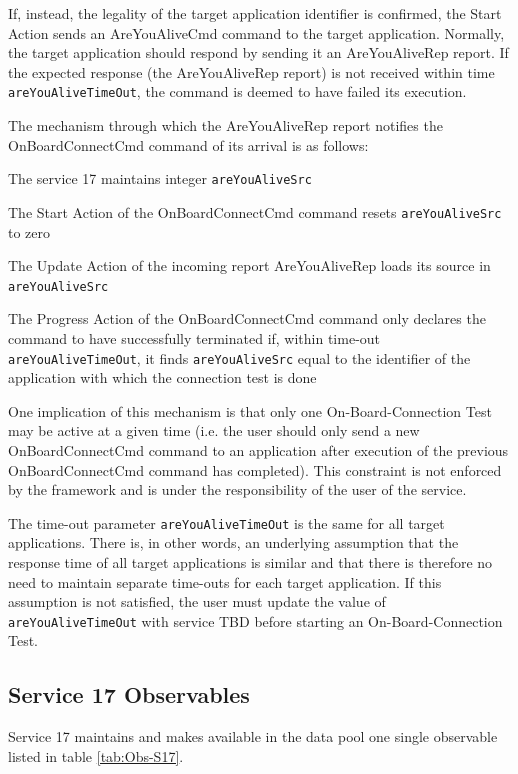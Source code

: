\documentclass[a4paper,10pt]{article}
\newenvironment{fw_itemize}						%
{\begin{itemize}
  \setlength{\itemsep}{1mm}
  \setlength{\parskip}{0pt}
  \setlength{\parsep}{0pt}}
{\end{itemize}}
\begin{document}
If, instead, the legality of the target application identifier is confirmed, the Start Action sends an AreYouAliveCmd command to the target application. Normally, the target application should respond by sending it an AreYouAliveRep report. If the expected response (the AreYouAliveRep report) is not received within time \texttt{areYouAliveTimeOut}, the command is deemed to have failed its execution.

The mechanism through which the AreYouAliveRep report notifies the OnBoardConnectCmd command of its arrival is as follows:

\begin{fw_itemize}
\item The service 17 maintains integer \texttt{areYouAliveSrc}
\item The Start Action of the OnBoardConnectCmd command resets \texttt{areYouAliveSrc} to zero
\item The Update Action of the incoming report AreYouAliveRep loads its source in \texttt{areYouAliveSrc}
\item The Progress Action of the OnBoardConnectCmd command only declares the command to have successfully terminated if, within time-out \texttt{areYouAliveTimeOut}, it finds \texttt{areYouAliveSrc} equal to the identifier of the application with which the connection test is done
\end{fw_itemize}

One implication of this mechanism is that only one On-Board-Connection Test may be active at a given time (i.e. the user should only send a new OnBoardConnectCmd command to an application after execution of the previous OnBoardConnectCmd command has completed). This constraint is not enforced by the framework and is under the responsibility of the user of the service.

The time-out parameter \texttt{areYouAliveTimeOut} is the same for all target applications. There is, in other words, an underlying assumption that the response time of all target applications is similar and that there is therefore no need to maintain separate time-outs for each target application. If this assumption is not satisfied, the user must update the value of \texttt{areYouAliveTimeOut} with service TBD before starting an On-Board-Connection Test.



\subsection{Service 17 Observables}\label{sec:serv17Obs}
Service 17 maintains and makes available in the data pool one single observable listed in table \ref{tab:Obs-S17}.
\end{document}
